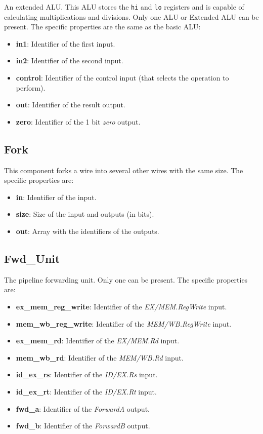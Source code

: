 \documentclass[11pt,a4paper,twoside,titlepage]{report}
\begin{document}
An extended ALU. This ALU stores the \verb+hi+ and \verb+lo+ registers and is
capable of calculating multiplications and divisions.
Only one ALU or Extended ALU can be present. The specific properties are the same
as the basic ALU:
\begin{itemize}
	\item \textbf{in1}: Identifier of the first input.
	\item \textbf{in2}: Identifier of the second input.
	\item \textbf{control}: Identifier of the control input (that selects the operation
		to perform).
	\item \textbf{out}: Identifier of the result output.
	\item \textbf{zero}: Identifier of the 1 bit \emph{zero} output.
\end{itemize}

\subsection{Fork}

This component forks a wire into several other wires with the same size.
The specific properties are:
\begin{itemize}
	\item \textbf{in}: Identifier of the input.
	\item \textbf{size}: Size of the input and outputs (in bits).
	\item \textbf{out}: Array with the identifiers of the outputs.
\end{itemize}

\subsection{Fwd\_Unit}

The pipeline forwarding unit. Only one can be present.
The specific properties are:
\begin{itemize}
	\item \textbf{ex\_mem\_reg\_write}: Identifier of the \textit{EX/MEM.RegWrite} input.
	\item \textbf{mem\_wb\_reg\_write}: Identifier of the \textit{MEM/WB.RegWrite} input.
	\item \textbf{ex\_mem\_rd}: Identifier of the \textit{EX/MEM.Rd} input.
	\item \textbf{mem\_wb\_rd}: Identifier of the \textit{MEM/WB.Rd} input.
	\item \textbf{id\_ex\_rs}: Identifier of the \textit{ID/EX.Rs} input.
	\item \textbf{id\_ex\_rt}: Identifier of the \textit{ID/EX.Rt} input.
	\item \textbf{fwd\_a}: Identifier of the \textit{ForwardA} output.
	\item \textbf{fwd\_b}: Identifier of the \textit{ForwardB} output.
\end{itemize}
\end{document}

